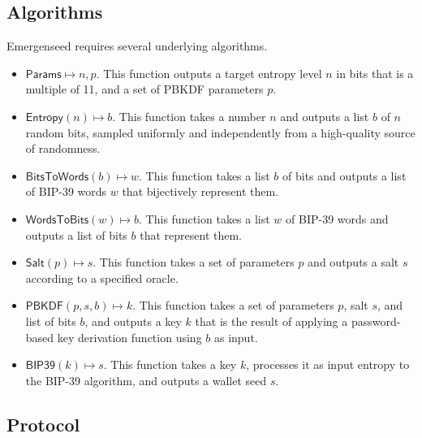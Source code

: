 \documentclass{article}
\begin{document}
\subsection{Algorithms}

Emergenseed requires several underlying algorithms.

\begin{itemize}
	\item $\mathsf{Params} \mapsto n, p$. This function outputs a target entropy level $n$ in bits that is a multiple of 11, and a set of PBKDF parameters $p$.
	\item $\mathsf{Entropy}(n) \mapsto b$. This function takes a number $n$ and outputs a list $b$ of $n$ random bits, sampled uniformly and independently from a high-quality source of randomness.
	\item $\mathsf{BitsToWords}(b) \mapsto w$. This function takes a list $b$ of bits and outputs a list of BIP-39 words $w$ that bijectively represent them.
	\item $\mathsf{WordsToBits}(w) \mapsto b$. This function takes a list $w$ of BIP-39 words and outputs a list of bits $b$ that represent them.
	\item $\mathsf{Salt}(p) \mapsto s$. This function takes a set of parameters $p$ and outputs a salt $s$ according to a specified oracle.
	\item $\mathsf{PBKDF}(p, s, b) \mapsto k$. This function takes a set of parameters $p$, salt $s$, and list of bits $b$, and outputs a key $k$ that is the result of applying a password-based key derivation function using $b$ as input.
	\item $\mathsf{BIP39}(k) \mapsto s$. This function takes a key $k$, processes it as input entropy to the BIP-39 algorithm, and outputs a wallet seed $s$.
\end{itemize}


\subsection{Protocol}
\end{document}
